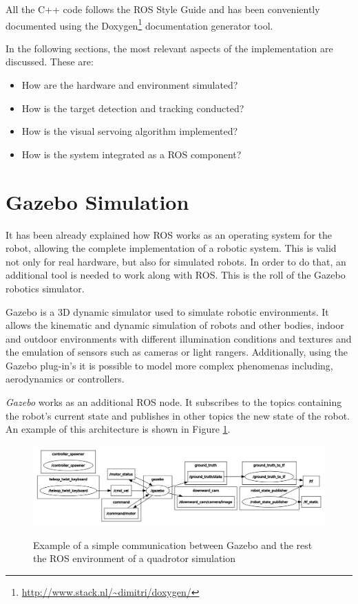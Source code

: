 All the C++ code follows the ROS Style Guide \cite{ROS_Style} and has been conveniently documented using the Doxygen\footnote{\url{http://www.stack.nl/~dimitri/doxygen/}} documentation generator tool.

In the following sections, the most relevant aspects of the implementation are discussed. These are: 

\begin{itemize}
	\item How are the hardware and environment simulated?
	
	\item How is the target detection and tracking conducted?
	
	\item How is the visual servoing algorithm implemented?
	
	\item How is the system integrated as a ROS component?
\end{itemize}


\section{Gazebo Simulation}
\label{sec:gazebo-simulation}

It has been already explained how ROS works as an operating system for the robot, allowing the complete implementation of a robotic system. This is valid not only for real hardware, but also for simulated robots. In order to do that, an additional tool is needed to work along with ROS. This is the roll of the Gazebo robotics simulator.

Gazebo is a 3D dynamic simulator used to simulate robotic environments. It allows the kinematic and dynamic simulation of robots and other bodies, indoor and outdoor environments with different illumination conditions and textures and the emulation of sensors such as cameras or light rangers. Additionally, using the Gazebo plug-in's it is possible to model more complex phenomenas including, aerodynamics or controllers.

\emph{Gazebo} works as an additional ROS node. It subscribes to the topics containing the robot's current state and publishes in other topics the new state of the robot. An example of this architecture is shown in Figure \ref{fig:gazebo_example}.

\begin{figure}[!htb]
	\caption{Example of a simple communication between Gazebo and the rest the ROS environment of a quadrotor simulation}
	\centering
	\includegraphics[width=\textwidth]{content/chapter_05/images/gazebo_example.png}
	\label{fig:gazebo_example}
\end{figure}

